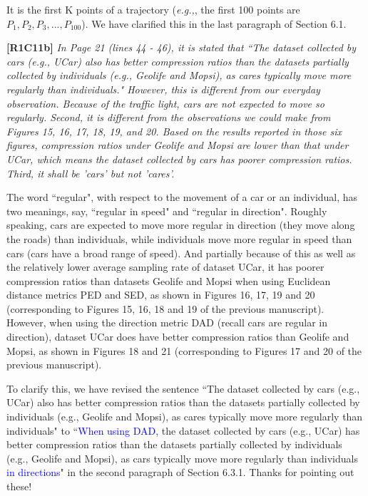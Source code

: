 \documentclass{letter}
\newcommand{\eg}{\emph{e.g.,}\xspace}
\begin{document}
{It is the first K points of a trajectory (\eg, the first 100 points are $P_1, P_2, P_3, ..., P_{100}$). We have clarified this in the last paragraph of Section 6.1.

\textbf{[R1C11b]} \emph{ In Page 21 (lines 44 - 46), it is stated that ``The dataset collected by cars (e.g., UCar) also has better compression ratios than the datasets partially collected by individuals (e.g., Geolife and Mopsi), as cares typically move more regularly than individuals." However, this is different from our everyday observation. Because of the traffic light, cars are not expected to move so regularly. Second, it is different from the observations we could make from Figures 15, 16, 17, 18, 19, and 20. Based on the results reported in those six figures, compression ratios under Geolife and Mopsi are lower than that under UCar, which means the dataset collected by cars has poorer compression ratios. Third, it shall be 'cars' but not 'cares'. }

The word ``regular", with respect to the movement of a car or an individual, has two meanings, say, ``regular in speed" and ``regular in direction". Roughly speaking, cars are expected to move more regular in direction (they move along the roads) than individuals, while individuals move more regular in speed than cars (cars have a broad range of speed).
And partially because of this as well as the relatively lower average sampling rate of dataset UCar, it has poorer compression ratios than datasets Geolife and Mopsi when using Euclidean distance metrics PED and SED, as shown in Figures 16, 17, 19 and 20 (corresponding to Figures 15, 16, 18 and 19 of the previous manuscript). However, when using the direction metric DAD (recall cars are regular in direction), dataset UCar does have better compression ratios than Geolife and Mopsi, as shown in Figures 18 and 21 (corresponding to Figures 17 and 20 of the previous manuscript).

To clarify this, we have revised the sentence ``The dataset collected by cars (e.g., UCar) also has better compression ratios than the datasets partially collected by individuals (e.g., Geolife and Mopsi), as cares typically move more regularly than individuals" to ``\textcolor{blue}{When using DAD,} the dataset collected by cars (e.g., UCar) has better compression ratios than the datasets partially collected by individuals (e.g., Geolife and Mopsi), as cars typically move more regularly than individuals \textcolor{blue}{in directions}" in the second paragraph of Section 6.3.1.
Thanks for pointing out these!


}
\end{document}
